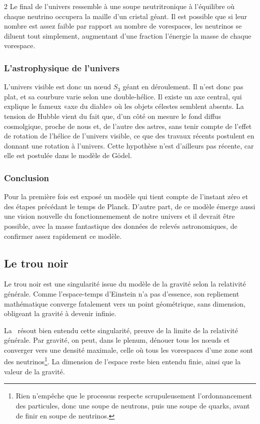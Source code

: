 \begin{multicols}{2}
Le final de l'univers ressemble à une soupe neutritronique à l'équilibre où chaque
neutrino occupera la maille d'un cristal géant. Il est possible que si
leur nombre est assez faible par rapport au nombre de
vorespaces, les neutrinos se diluent tout simplement, augmentant d'une
fraction l'énergie la masse de chaque vorespace.

\subsubsection{L'astrophysique de l'univers}

L'univers visible est donc un nœud $S_3$ géant en déroulement. Il n'est
donc pas plat, et sa courbure varie selon une double-hélice. Il existe
un axe central, qui explique le fameux «axe du diable» où les objets célestes semblent
absents. La tension de Hubble vient du fait que,
d'un côté on mesure le fond diffus cosmolgique, proche de nous et, de
l'autre des astres, sans tenir compte de l'effet de rotation de
l'hélice de l'univers visible,  ce que des travaux récents postulent en donnant une rotation à l'univers\cite{lodha2024hubble}. Cette hypothèse n'est d'ailleurs pas récente, car elle est postulée dans le modèle de Gödel\cite{godel1949example}.

\subsubsection{Conclusion}

Pour la première fois est exposé un modèle qui tient compte de
l'instant zéro et des étapes précédant le temps de Planck. D'autre
part, de ce modèle émerge aussi une vision nouvelle du
fonctionnemement de notre univers et il devrait être possible, avec la
masse fantastique des données de relevés astronomiques, de confirmer
assez rapidement ce modèle.

\subsection{Le trou noir}

Le trou noir est une singularité issue du modèle de la gravité selon
la relativité générale. Comme l'espace-temps d'Einstein n'a pas
d'essence, son repliement mathématique converge fatalement vers un
point géométrique, sans dimension, obligeant la gravité à devenir
infinie.

La \PQ\ résout bien entendu cette singularité, preuve de la limite de la
relativité générale. Par gravité, on peut, dans le plenum, dénouer tous les
nœuds et converger vers une densité maximale, celle où tous les
vorespaces d'une zone sont des neutrinos\footnote{Rien n'empêche que le processus respecte scrupuleusement l'ordonnancement des particules, donc une soupe de neutrons, puis une soupe de quarks, avant de finir en soupe de neutrinos.}. La dimension de l'espace
reste bien entendu finie, ainsi que la valeur de la gravité.


\end{multicols}
